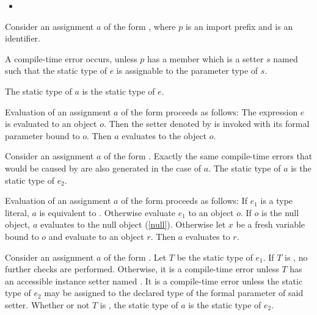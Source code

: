 \documentclass[makeidx]{article}
\begin{document}
{\begin{itemize}
\item
\end{itemize}
\EndCase

\LMHash{}%
Consider an assignment $a$ of the form ,
where $p$ is an import prefix and \id{} is an identifier.

\LMHash{}%
A compile-time error occurs,
unless $p$ has a member which is a setter $s$ named 
such that the static type of $e$
is assignable to the parameter type of $s$.

\LMHash{}%
The static type of $a$ is the static type of $e$.

\LMHash{}%
Evaluation of an assignment $a$ of the form 
proceeds as follows:
The expression $e$ is evaluated to an object $o$.
Then the setter denoted by  is invoked
with its formal parameter bound to $o$.
Then $a$ evaluates to the object $o$.
\EndCase

\LMHash{}%
Consider an assignment $a$ of the form .
Exactly the same compile-time errors that would be caused by
 are also generated in the case of $a$.
The static type of $a$ is the static type of $e_2$.

\LMHash{}%
Evaluation of an assignment $a$ of the form 
proceeds as follows:
If $e_1$ is a type literal, $a$ is equivalent to .
Otherwise evaluate $e_1$ to an object $o$.
If $o$ is the null object, $a$ evaluates to the null object (\ref{null}).
Otherwise let $x$ be a fresh variable bound to $o$
and evaluate  to an object $r$.
Then $a$ evaluates to $r$.
\EndCase

\LMHash{}%
Consider an assignment $a$ of the form .
Let $T$ be the static type of $e_1$.
If $T$ is \DYNAMIC, no further checks are performed.
Otherwise, it is a compile-time error unless
$T$ has an accessible instance setter named .
It is a compile-time error unless the static type of $e_2$
may be assigned to the declared type of the formal parameter of said setter.
Whether or not $T$ is \DYNAMIC,
the static type of $a$ is the static type of $e_2$.

}
\end{document}
